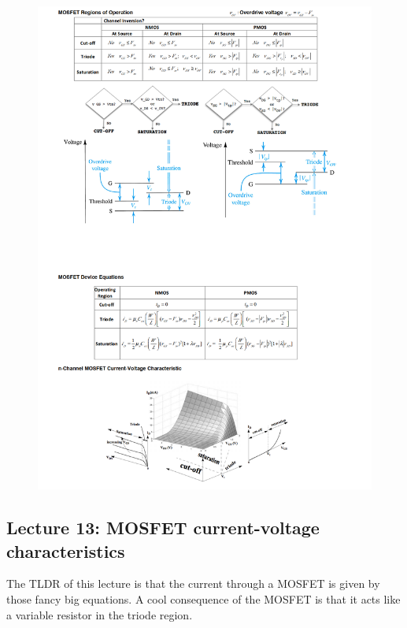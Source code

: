 \documentclass[../notes.tex]{subfiles}
\begin{document}
\begin{fullpage}
\begin{figure}[H]
	\centering
	\includegraphics[width=0.8\linewidth]{img/image_2022-10-20-00-57-53.png}
\end{figure}
\end{fullpage}

\subsection{Lecture 13: MOSFET current-voltage characteristics}

The TLDR of this lecture is that the current through a MOSFET is given by those fancy big equations.
A cool consequence of the MOSFET is that it acts like a variable resistor in the triode region.
\end{document}
